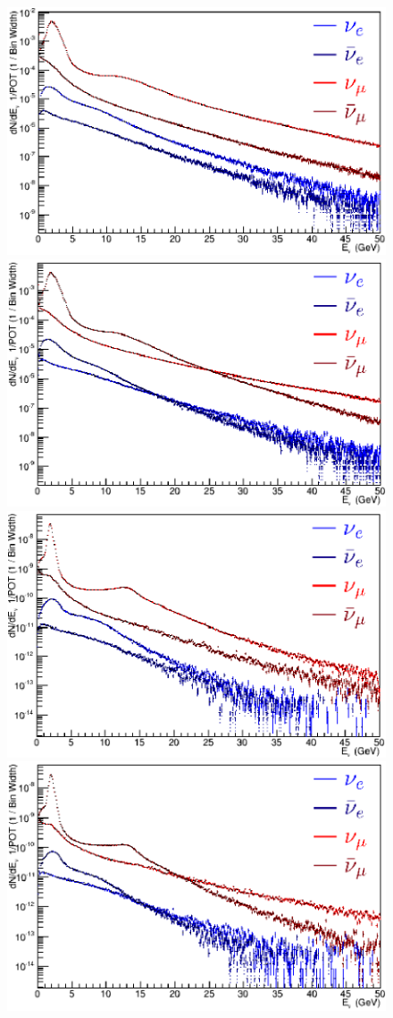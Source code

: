 \begin{figure}[htb!]
\begin{center}
\includegraphics[width=0.9\columnwidth]{./NOvA/ND_n.eps}
\includegraphics[width=0.9\columnwidth]{./NOvA/ND_a.eps}
\includegraphics[width=0.9\columnwidth]{./NOvA/FD_n.eps}
\includegraphics[width=0.9\columnwidth]{./NOvA/FD_a.eps}

\end{center}
\end{figure}
